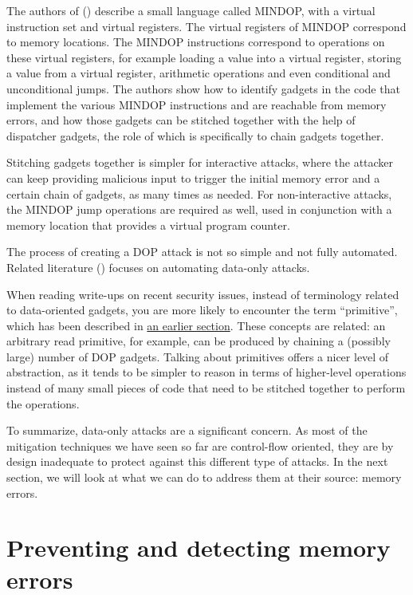 \documentclass[
  a4paper,
]{report}
\begin{document}
The authors of () describe a small
language called MINDOP, with a virtual instruction set and virtual
registers. The virtual registers of MINDOP correspond to memory
locations. The MINDOP instructions correspond to operations on these
virtual registers, for example loading a value into a virtual register,
storing a value from a virtual register, arithmetic operations and even
conditional and unconditional jumps. The authors show how to identify
gadgets in the code that implement the various MINDOP instructions and
are reachable from memory errors, and how those gadgets can be stitched
together with the help of dispatcher gadgets, the role of which is
specifically to chain gadgets together.

Stitching gadgets together is simpler for interactive attacks, where the
attacker can keep providing malicious input to trigger the initial
memory error and a certain chain of gadgets, as many times as needed.
For non-interactive attacks, the MINDOP jump operations are required as
well, used in conjunction with a memory location that provides a virtual
program counter.

The process of creating a DOP attack is not so simple and not fully
automated. Related literature () focuses on automating data-only attacks.

When reading write-ups on recent security issues, instead of terminology
related to data-oriented gadgets, you are more likely to encounter the
term ``primitive'', which has been described in
\hyperref[exploitation-primitives]{an earlier section}. These concepts
are related: an arbitrary read primitive, for example, can be produced
by chaining a (possibly large) number of DOP gadgets. Talking about
primitives offers a nicer level of abstraction, as it tends to be
simpler to reason in terms of higher-level operations instead of many
small pieces of code that need to be stitched together to perform the
operations.

To summarize, data-only attacks are a significant concern. As most of
the mitigation techniques we have seen so far are control-flow oriented,
they are by design inadequate to protect against this different type of
attacks. In the next section, we will look at what we can do to address
them at their source: memory errors.

\section{Preventing and detecting memory
errors}\label{sec:preventing-and-detecting-memory-errors}
\end{document}
